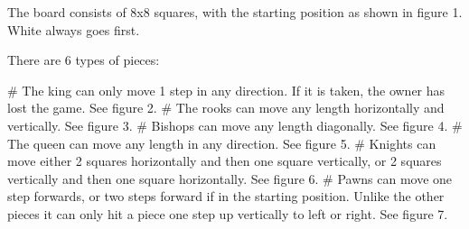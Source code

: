 \documentclass{article}
\begin{document}
The board consists of 8x8 squares, with the starting position as shown in figure 1. White always goes first.

\noindent There are 6 types of pieces: \\
\begin{easylist}[itemize]
    # The king can only move 1 step in any direction. If it is taken, the owner has lost the game. See figure 2.
    # The rooks can move any length horizontally and vertically. See figure 3.
    # Bishops can move any length diagonally. See figure 4.
    # The queen can move any length in any direction. See figure 5.
    # Knights can move either 2 squares horizontally and then one square vertically, or 2 squares vertically and then one square horizontally. See figure 6.
    # Pawns can move one step forwards, or two steps forward if in the starting position. Unlike the other pieces it can only hit a piece one step up vertically to left or right. See figure 7.
\end{easylist}
\end{document}
